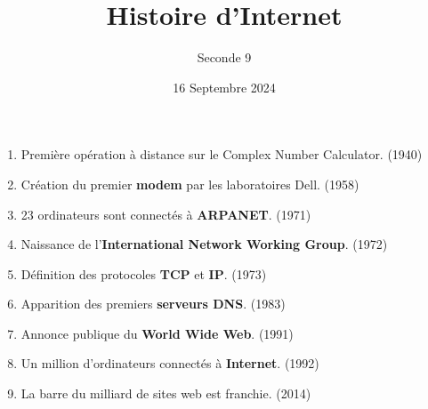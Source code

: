 \documentclass{article}
\title{Histoire d'Internet}
\date{16 Septembre 2024}
\author{Seconde 9}
\begin{document}
\maketitle

\begin{enumerate}
\item Première opération à distance sur le Complex Number Calculator. (1940)
\item Création du premier \textbf{modem} par les laboratoires Dell. (1958)
\item 23 ordinateurs sont connectés à \textbf{ARPANET}. (1971)
\item Naissance de l'\textbf{International Network Working Group}. (1972)
\item Définition des protocoles \textbf{TCP} et \textbf{IP}. (1973)
\item Apparition des premiers \textbf{serveurs DNS}. (1983)
\item Annonce publique du \textbf{World Wide Web}. (1991)
\item Un million d'ordinateurs connectés à \textbf{Internet}. (1992)
\item La barre du milliard de sites web est franchie. (2014)
\end{enumerate}
\end{document}

